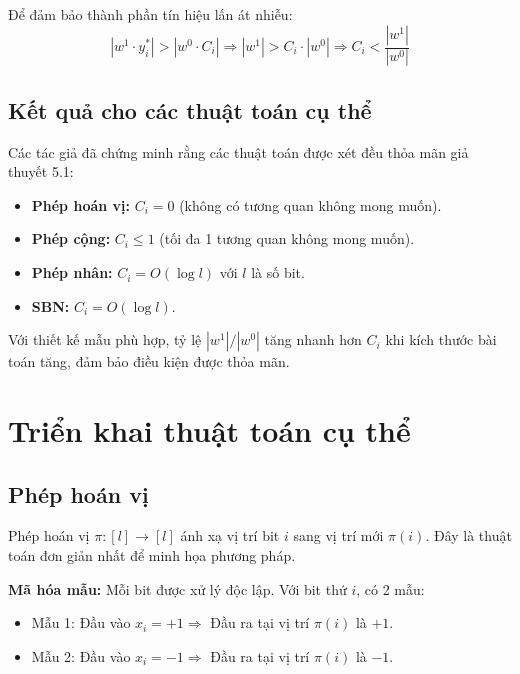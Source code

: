 Để đảm bảo thành phần tín hiệu lấn át nhiễu:
\begin{equation}
    |w^1 \cdot y_i^*| > |w^0 \cdot C_i| \Rightarrow |w^1| > C_i \cdot |w^0| \Rightarrow C_i < \frac{|w^1|}{|w^0|}
\end{equation}

\subsection{Kết quả cho các thuật toán cụ thể}

Các tác giả đã chứng minh rằng các thuật toán được xét đều thỏa mãn giả thuyết 5.1:
\begin{itemize}
    \item \textbf{Phép hoán vị:} $C_i = 0$ (không có tương quan không mong muốn).
    \item \textbf{Phép cộng:} $C_i \leq 1$ (tối đa 1 tương quan không mong muốn).
    \item \textbf{Phép nhân:} $C_i = O(\log l)$ với $l$ là số bit.
    \item \textbf{SBN:} $C_i = O(\log l)$.
\end{itemize}

Với thiết kế mẫu phù hợp, tỷ lệ $|w^1|/|w^0|$ tăng nhanh hơn $C_i$ khi kích thước bài toán tăng, đảm bảo điều kiện được thỏa mãn.

\section{Triển khai thuật toán cụ thể}

\subsection{Phép hoán vị}

Phép hoán vị $\pi: [l] \rightarrow [l]$ ánh xạ vị trí bit $i$ sang vị trí mới $\pi(i)$. Đây là thuật toán đơn giản nhất để minh họa phương pháp.

\vspace{0.2cm}

\textbf{Mã hóa mẫu:} Mỗi bit được xử lý độc lập. Với bit thứ $i$, có 2 mẫu:
\begin{itemize}
    \item Mẫu 1: Đầu vào $x_i = +1 \Rightarrow$ Đầu ra tại vị trí $\pi(i)$ là $+1$.
    \item Mẫu 2: Đầu vào $x_i = -1 \Rightarrow$ Đầu ra tại vị trí $\pi(i)$ là $-1$.
\end{itemize}

